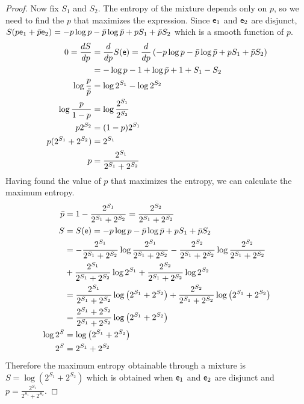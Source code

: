 \begin{proof}
	Now fix $S_1$ and $S_2$. The entropy of the mixture depends only on $p$, so we need to find the $p$ that maximizes the expression. Since $\mathsf{e}_1$ and $\mathsf{e}_2$ are disjunct, $S(p \mathsf{e}_1 + \bar{p}\mathsf{e}_2) =  - p \log p - \bar{p} \log \bar{p} + p S_1 + \bar{p} S_2$ which is a smooth function of $p$.
	\begin{equation}
		\begin{aligned}
			0 = \frac{dS}{dp} &= \frac{d}{dp} S(\mathsf{e}) =\frac{d}{dp} \left( - p \log p - \bar{p} \log \bar{p} + p S_1 + \bar{p} S_2 \right) \\
			&= - \log p - 1 + \log \bar{p} + 1 + S_1 - S_2 \\
			\log \frac{p}{\bar{p}} &= \log 2^{S_1} - \log 2^{S_2} \\
			\log \frac{p}{1-p} &= \log \frac{2^{S_1}}{2^{S_2}}  \\
			p 2^{S_2} &= (1-p) 2^{S_1}  \\
			p (2^{S_1} + 2^{S_2}) &= 2^{S_1}  \\
			p &= \frac{2^{S_1}}{2^{S_1} + 2^{S_2}}  \\
		\end{aligned}
	\end{equation}
	Having found the value of $p$ that maximizes the entropy, we can calculate the maximum entropy.
	\begin{equation}
	\begin{aligned}
		\bar{p} &= 1- \frac{2^{S_1}}{2^{S_1} + 2^{S_2}} = \frac{2^{S_2}}{2^{S_1} + 2^{S_2}} \\
		S &= S(\mathsf{e}) = - p \log p - \bar{p} \log \bar{p} + p S_1 + \bar{p} S_2  \\
		&= - \frac{2^{S_1}}{2^{S_1} + 2^{S_2}} \log \frac{2^{S_1}}{2^{S_1} + 2^{S_2}} - \frac{2^{S_2}}{2^{S_1} + 2^{S_2}} \log \frac{2^{S_2}}{2^{S_1} + 2^{S_2}} \\
		&+ \frac{2^{S_1}}{2^{S_1} + 2^{S_2}} \log 2^{S_1} + \frac{2^{S_2}}{2^{S_1} + 2^{S_2}} \log 2^{S_2} \\
		&= \frac{2^{S_1}}{2^{S_1} + 2^{S_2}} \log \left( 2^{S_1} + 2^{S_2} \right) + \frac{2^{S_2}}{2^{S_1} + 2^{S_2}} \log \left( 2^{S_1} + 2^{S_2} \right) \\
		&= \frac{2^{S_1} + 2^{S_2}}{2^{S_1} + 2^{S_2}} \log \left( 2^{S_1} + 2^{S_2} \right) \\
		\log 2^S &= \log \left( 2^{S_1} + 2^{S_2} \right) \\
		2^S &=  2^{S_1} + 2^{S_2}  \\
	\end{aligned}
	\end{equation}
	Therefore the maximum entropy obtainable through a mixture is $S = \log (2^{S_1} + 2^{S_2})$ which is obtained when $\mathsf{e}_1$ and $\mathsf{e}_2$ are disjunct and $p = \frac{2^{S_1}}{2^{S_1} + 2^{S_2}}$.
\end{proof}

